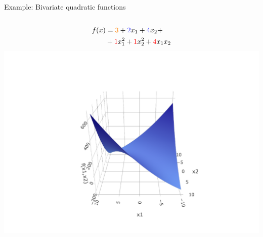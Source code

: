 \documentclass[11pt,compress,t,notes=noshow, xcolor=table]{beamer}
\begin{document}
\begin{vbframe}{Example: Bivariate quadratic functions}
\begin{columns}
  \begin{column}{0.33\textwidth}
    \begin{center}
      \begin{equation*}
        \begin{split}
          f(x) &= \textcolor{orange}{3} + \textcolor{blue}{2} x_1 + 
          \textcolor{blue}{4} x_2 + \\
          &+ \textcolor{red}{1} x_1^2 + \textcolor{red}{1} x_2^2 
          + \textcolor{red}{4} x_1 x_2
        \end{split}
      \end{equation*}
      \vspace*{-1.5\baselineskip}
      \includegraphics[trim = 100 10 100 50, clip, 
      width = \textwidth]{figure/hs-quadric-3.pdf}
    \end{center}
  \end{column}

  \normalsize
  
\end{columns}
\end{vbframe}
\end{document}
